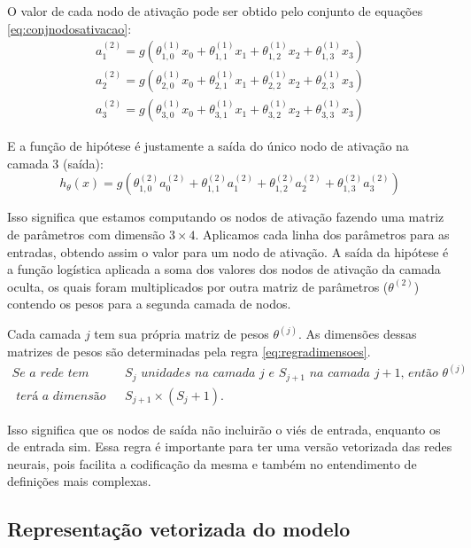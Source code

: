 O valor de cada nodo de ativação pode ser obtido pelo conjunto de equações \ref{eq:conjnodosativacao}:
\begin{align}
a_1^{(2)} = g(\theta_{1,0}^{(1)}x_0 + \theta_{1,1}^{(1)}x_1 + \theta_{1,2}^{(1)}x_2 + \theta_{1,3}^{(1)}x_3) \nonumber \\
a_2^{(2)} = g(\theta_{2,0}^{(1)}x_0 + \theta_{2,1}^{(1)}x_1 + \theta_{2,2}^{(1)}x_2 + \theta_{2,3}^{(1)}x_3) \nonumber \\
a_3^{(2)} = g(\theta_{3,0}^{(1)}x_0 + \theta_{3,1}^{(1)}x_1 + \theta_{3,2}^{(1)}x_2 + \theta_{3,3}^{(1)}x_3) \label{eq:conjnodosativacao}
\end{align}

E a função de hipótese é justamente a saída do único nodo de ativação na camada 3 (saída):
\begin{equation}
h_{\theta}(x) = g(\theta_{1,0}^{(2)}a_0^{(2)} + \theta_{1,1}^{(2)}a_1^{(2)} + \theta_{1,2}^{(2)}a_2^{(2)} + \theta_{1,3}^{(2)}a_3^{(2)}) \nonumber
\end{equation}

Isso significa que estamos computando os nodos de ativação fazendo uma matriz de parâmetros com dimensão $3 \times 4$. Aplicamos cada linha dos parâmetros para as entradas, obtendo assim o valor para um nodo de ativação. A saída da hipótese é a função logística aplicada a soma dos valores dos nodos de ativação da camada oculta, os quais foram multiplicados por outra matriz de parâmetros ($\theta^{(2)}$) contendo os pesos para a segunda camada de nodos.

Cada camada $j$ tem sua própria matriz de pesos $\theta^{(j)}$. As dimensões dessas matrizes de pesos são determinadas pela regra \ref{eq:regradimensoes}. 
\begin{align} 
\textit{Se a rede tem } & S_j \textit{ unidades na camada } j \textit{ e } S_{j+1} \textit{ na camada } j+1\textit{, então } \theta^{(j)} \nonumber \\ 
\textit{ terá a dimensão de } & S_{j+1} \times (S_j + 1)\textit{.} \label{eq:regradimensoes}
\end{align}

Isso significa que os nodos de saída não incluirão o viés de entrada, enquanto os de entrada sim. Essa regra é importante para ter uma versão vetorizada das redes neurais, pois facilita a codificação da mesma e também no entendimento de definições mais complexas.


\subsection{Representação vetorizada do modelo}


